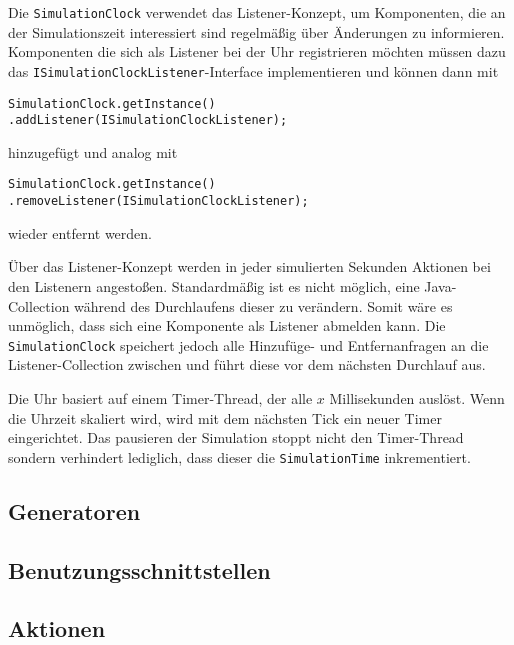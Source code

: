 Die \texttt{SimulationClock} verwendet das Listener-Konzept, um Komponenten, die an der Simulationszeit interessiert sind regelmäßig über Änderungen zu informieren. Komponenten die sich als Listener bei der Uhr registrieren möchten müssen dazu das \texttt{ISimulationClockListener}-Interface implementieren und können dann mit \begin{lstlisting}
SimulationClock.getInstance()
.addListener(ISimulationClockListener);
\end{lstlisting}
hinzugefügt und analog mit
\begin{lstlisting}
SimulationClock.getInstance()
.removeListener(ISimulationClockListener);
\end{lstlisting}
wieder entfernt werden.

Über das Listener-Konzept werden in jeder simulierten Sekunden Aktionen bei den Listenern angestoßen. Standardmäßig ist es nicht möglich, eine Java-Collection während des Durchlaufens dieser zu verändern. Somit wäre es unmöglich, dass sich eine Komponente als Listener abmelden kann. Die \texttt{SimulationClock} speichert jedoch alle Hinzufüge- und Entfernanfragen an die Listener-Collection zwischen und führt diese vor dem nächsten Durchlauf aus.

Die Uhr basiert auf einem Timer-Thread, der alle $x$ Millisekunden auslöst. Wenn die Uhrzeit skaliert wird, wird mit dem nächsten Tick ein neuer Timer eingerichtet. Das pausieren der Simulation stoppt nicht den Timer-Thread sondern verhindert lediglich, dass dieser die \texttt{SimulationTime} inkrementiert.


\subsection{Generatoren}\label{subsec:real_generator}

\subsection{Benutzungsschnittstellen}\label{subsec:real_interfaces}


\subsection{Aktionen}\label{subsec:real_actions}

